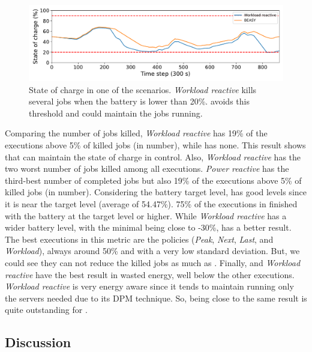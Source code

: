 \begin{figure}[!htb]
    \centering
    \includegraphics[scale=0.5]{Images/Heuristic/diff_state_of_charge.pdf}
    \caption{State of charge in one of the scenarios. \emph{Workload reactive} kills several jobs when the battery is lower than 20\%. \emph{\systemName} avoids this threshold and could maintain the jobs running.}
    \label{fig:soc_average}
\end{figure}

Comparing the number of jobs killed, \emph{Workload reactive} has 19\% of the executions above 5\% of killed jobs (in number), while \emph{\systemName} has none. This result shows that \emph{\systemName} can maintain the state of charge in control. Also, \emph{Workload reactive} has the two worst number of jobs killed among all executions. \emph{Power reactive} has the third-best number of completed jobs but also 19\% of the executions above 5\% of killed jobs (in number). Considering the battery target level, \emph{\systemName} has good levels since it is near the target level (average of 54.47\%). 75\% of the executions in \emph{\systemName} finished with the battery at the target level or higher. While \emph{Workload reactive} has a wider battery level, with the minimal being close to -30\%, \emph{\systemName} has a better result. The best executions in this metric are the policies (\emph{Peak}, \emph{Next}, \emph{Last}, and \emph{Workload}), always around 50\% and with a very low standard deviation. But, we could see they can not reduce the killed jobs as much as \emph{\systemName}. Finally, \emph{\systemName} and \emph{Workload reactive} have the best result in wasted energy, well below the other executions. \emph{Workload reactive} is very energy aware since it tends to maintain running only the servers needed due to its DPM technique. So, being close to the same result is quite outstanding for \emph{\systemName}. 

\subsection{Discussion}

